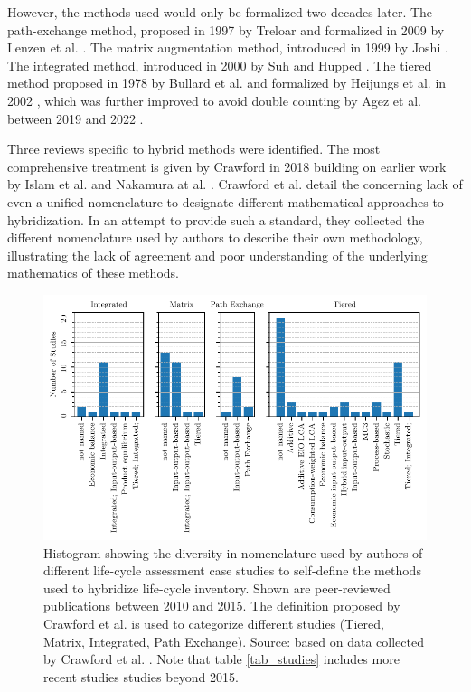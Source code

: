 \documentclass{article}
\begin{document}
        However, the methods used would only be formalized two decades later. The path-exchange method, proposed in 1997 by Treloar \cite{treloar_extracting_1997} and formalized in 2009 by Lenzen et al. \cite{lenzen_path_2009}. The matrix augmentation method, introduced in 1999 by Joshi \cite{joshi_product_1999}. The integrated method, introduced in 2000 by Suh and Hupped \cite{suh_gearing_2000}. The tiered method proposed in 1978 by Bullard et al. \cite{bullard_net_1978} and formalized by Heijungs et al. in 2002 \cite{heijungs_computational_2002}, which was further improved to avoid double counting by Agez et al. between 2019 and 2022 \cite{agez_lifting_2019}\cite{agez_hybridization_2020}\cite{agez_correcting_2022}.

        Three reviews specific to hybrid methods were identified. The most comprehensive treatment is given by Crawford in 2018 \cite{crawford_hybrid_2018} building on earlier work by Islam et al. \cite{islam_review_2016} and Nakamura at al. \cite{nakamura_inputoutput_2016}. Crawford et al. detail the concerning lack of even a unified nomenclature to designate different mathematical approaches to hybridization. In an attempt to provide such a standard, they collected the different nomenclature used by authors to describe their own methodology, illustrating the lack of agreement and poor understanding of the underlying mathematics of these methods. 
        
        \begin{figure}[h!]
        	\centering
        	\includegraphics[width=\textwidth]{latex/figures/2_nomenclature.pdf}
        	\caption{Histogram showing the diversity in nomenclature used by authors of different life-cycle assessment case studies to self-define the methods used to hybridize life-cycle inventory. Shown are peer-reviewed publications between 2010 and 2015. The definition proposed by Crawford et al. is used to categorize different studies (Tiered, Matrix, Integrated, Path Exchange). Source: based on data collected by Crawford et al. \cite{crawford_hybrid_2018}. Note that table \ref{tab_studies} includes more recent studies studies beyond 2015.}
        	\label{fig:nomenclature}
        \end{figure}
        
\end{document}
